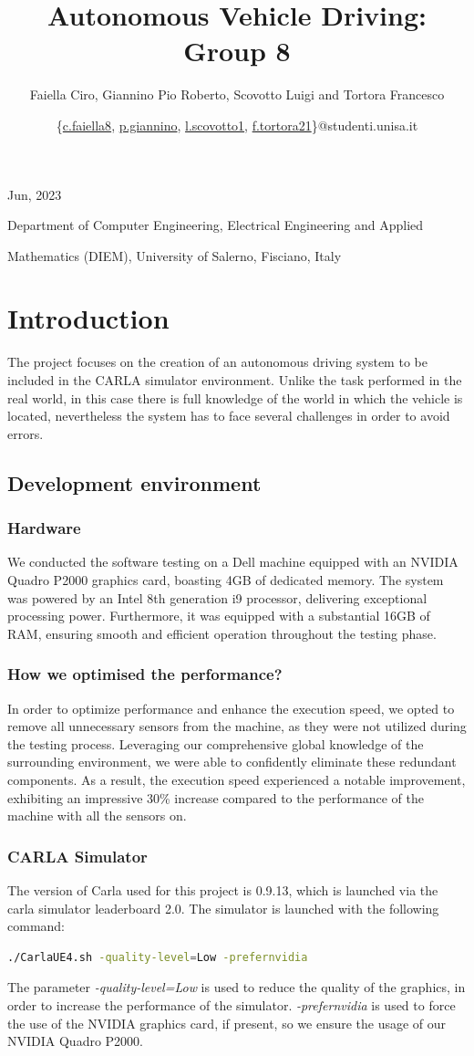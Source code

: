 \documentclass{article}
\title{\textbf{\myfont Autonomous Vehicle Driving: Group 8}}
\author{\small{Faiella Ciro, Giannino Pio Roberto, Scovotto Luigi and Tortora Francesco}}
\date{\small{\{\href{mailto:c.faiella8@studenti.unisa.it}{c.faiella8}, \href{mailto:p.giannino@studenti.unisa.it}{p.giannino}, \href{mailto:l.scovotto1@studenti.unisa.it}{l.scovotto1}, \href{mailto:f.tortora21@studenti.unisa.it}{f.tortora21}\}@studenti.unisa.it}}
\begin{document}
\maketitle
\centerline{\small{Jun, 2023}}
\centerline{Department of Computer Engineering, Electrical Engineering and Applied}
\centerline{Mathematics (DIEM), University of Salerno, Fisciano, Italy}
\newpage
\tableofcontents
\newpage
\section{Introduction}
The project focuses on the creation of an autonomous driving system to be included in the CARLA simulator
environment. Unlike the task performed in the real world, in this case there is full knowledge of the world
in which the vehicle is located, nevertheless the system has to face several challenges in order to avoid
errors.

\subsection{Development environment}
\subsubsection{Hardware}
We conducted the software testing on a Dell machine equipped with an NVIDIA Quadro P2000 graphics card, boasting 4GB of dedicated memory.
The system was powered by an Intel 8th generation i9 processor, delivering exceptional processing power. Furthermore, it was equipped with a
substantial 16GB of RAM, ensuring smooth and efficient operation throughout the testing phase.

\subsubsection{How we optimised the performance?}
In order to optimize performance and enhance the execution speed, we opted to remove all unnecessary sensors from the machine,
as they were not utilized during the testing process. Leveraging our comprehensive global knowledge of the surrounding environment,
we were able to confidently eliminate these redundant components.
As a result, the execution speed experienced a notable improvement, exhibiting an impressive 30\% increase compared to the performance of
the machine with all the sensors on.

\subsubsection{CARLA Simulator}
The version of Carla used for this project is 0.9.13, which is launched via the carla simulator leaderboard 2.0.
The simulator is launched with the following command:
\begin{lstlisting}[language=Bash]
    ./CarlaUE4.sh -quality-level=Low -prefernvidia
\end{lstlisting}
The parameter \textit{-quality-level=Low} is used to reduce the quality of the graphics, in order to increase the
performance of the simulator. \textit{-prefernvidia} is used to force the use of the NVIDIA graphics card, if present, so we ensure the usage of our NVIDIA Quadro P2000.
\end{document}
